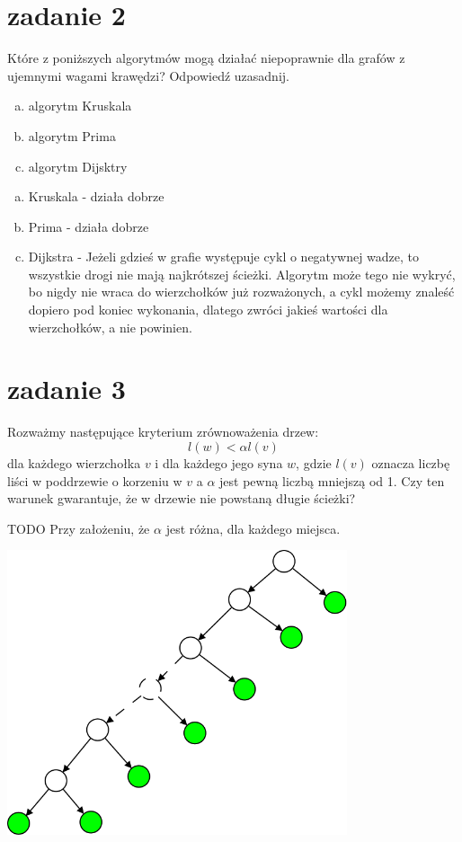 \documentclass[svgnames]{report}
\begin{document}
\section{zadanie 2}
\begin{framed}
Które z poniższych algorytmów mogą działać niepoprawnie dla grafów z ujemnymi wagami krawędzi? Odpowiedź uzasadnij.
\begin{enumerate}[a)]
	\item algorytm Kruskala
	\item algorytm Prima
	\item algorytm Dijsktry
\end{enumerate}
\end{framed}

\begin{enumerate}[a)]
\item Kruskala - działa dobrze
\item Prima - działa dobrze
\item Dijkstra - Jeżeli gdzieś w grafie występuje cykl o negatywnej wadze, to wszystkie drogi nie mają najkrótszej ścieżki. Algorytm może tego nie wykryć, bo nigdy nie wraca do wierzchołków już rozważonych, a cykl możemy znaleść dopiero pod koniec wykonania, dlatego zwróci jakieś wartości dla wierzchołków, a nie powinien.
\end{enumerate}

\section{zadanie 3}
\begin{framed}
 Rozważmy następujące kryterium zrównoważenia drzew:
$$ l(w) < \alpha l(v) $$
dla każdego wierzchołka $v$ i dla każdego jego syna $w$, gdzie $l(v)$ oznacza liczbę liści w poddrzewie o korzeniu w $v$ a $\alpha$ jest pewną liczbą mniejszą od 1.
Czy ten warunek gwarantuje, że w drzewie nie powstaną długie ścieżki?
\end{framed}
TODO Przy założeniu, że $\alpha$ jest różna, dla każdego miejsca.

  \includegraphics[width=10cm]{images/3.png}
  
\end{document}
